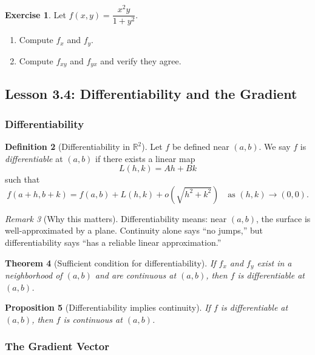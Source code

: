 \documentclass[12pt]{article}
\numberwithin{equation}{section}
\newcommand{\RR}{\mathbb{R}}
\theoremstyle{plain}
\newtheorem{theorem}{Theorem}[section]
\newtheorem{proposition}[theorem]{Proposition}
\theoremstyle{definition}
\newtheorem{definition}[theorem]{Definition}
\newtheorem{exercise}[theorem]{Exercise}
\theoremstyle{remark}
\newtheorem{remark}[theorem]{Remark}
\begin{document}
\begin{exercise}
Let $f(x,y)=\dfrac{x^2y}{1+y^2}$.
\begin{enumerate}[label=(\alph*)]
\item Compute $f_x$ and $f_y$.
\item Compute $f_{xy}$ and $f_{yx}$ and verify they agree.
\end{enumerate}
\end{exercise}

\subsection{Lesson 3.4: Differentiability and the Gradient}

\subsubsection{Differentiability}

\begin{definition}[Differentiability in $\RR^2$]\label{def:differentiable}
Let $f$ be defined near $(a,b)$. We say $f$ is \emph{differentiable} at $(a,b)$ if there exists a linear map
\[
L(h,k)=Ah+Bk
\]
such that
\begin{equation}\label{eq:diff-def}
f(a+h,b+k)=f(a,b)+L(h,k)+o\!\left(\sqrt{h^2+k^2}\right)
\quad\text{as }(h,k)\to(0,0).
\end{equation}
\end{definition}

\begin{remark}[Why this matters]
Differentiability means: near $(a,b)$, the surface is well-approximated by a plane.  
Continuity alone says “no jumps,” but differentiability says “has a reliable linear approximation.”
\end{remark}

\begin{theorem}[Sufficient condition for differentiability]\label{thm:cont-partials}
If $f_x$ and $f_y$ exist in a neighborhood of $(a,b)$ and are continuous at $(a,b)$, then $f$ is differentiable at $(a,b)$.
\end{theorem}

\begin{proposition}[Differentiability implies continuity]
If $f$ is differentiable at $(a,b)$, then $f$ is continuous at $(a,b)$.
\end{proposition}

\subsubsection{The Gradient Vector}
\end{document}
